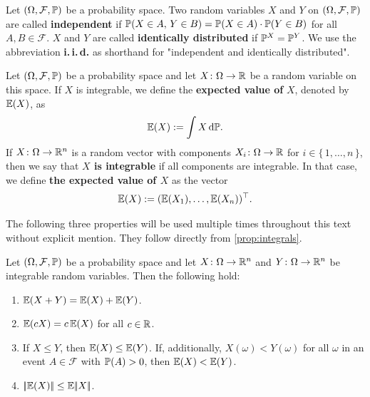 \begin{definition}
    Let $(\Omega, \mathcal{F}, \mathbb{P})$ be a probability space. Two random variables $X$ and $Y$
    on $(\Omega, \mathcal{F}, \mathbb{P})$ are called \textbf{independent} if $\mathbb{P}(X\in A,\, Y\in B)
    = \mathbb{P}(X\in A)\cdot \mathbb{P}(Y\in B)$ for all $A,B\in\mathcal{F}$. $X$ and $Y$ are called
    \textbf{identically distributed} if $\mathbb{P}^X = \mathbb{P}^Y$.
    We use the abbreviation \textbf{i.\,i.\,d.} as shorthand for "independent and identically distributed".
\end{definition}

\begin{definition}
    Let $(\Omega, \mathcal{F}, \mathbb{P})$ be a probability space and let $X\colon\Omega\to\mathbb{R}$
    be a random variable on this space.
    If $X$ is integrable, we define the \textbf{expected value of} $X$,
    denoted by $\mathbb{E}(X)$, as
    \[
        \mathbb{E}(X) := \int X \, \textnormal{d}\mathbb{P}.
    \]
    If $X\colon\Omega\to\mathbb{R}^n$ is a random vector with components
    $X_i\colon\Omega\to\mathbb{R}$ for $i\in\{\, 1,\dots,n \,\}$, then we
    say that \textbf{$X$ is integrable} if all components are integrable. In that case,
    we define \textbf{the expected
    value of $X$} as the vector
    \[
        \mathbb{E}(X) := (\mathbb{E}(X_1),\dots, \mathbb{E}(X_n))^\top.
    \]
\end{definition}
The following three properties will be used multiple times throughout this text without explicit mention. They
follow directly from \cref{prop:integrals}.
\begin{proposition}
    \label{prop:properties-of-expected-value}
    Let $(\Omega, \mathcal{F}, \mathbb{P})$ be a
    probability space and let $X\colon \Omega \to \mathbb{R}^n$ and
    $Y\colon \Omega \to \mathbb{R}^n$ be integrable random variables. Then the following hold:
    \begin{enumerate}
        \item[(i)] $\mathbb{E}(X + Y) = \mathbb{E}(X) + \mathbb{E}(Y)$.
        \item[(ii)] $\mathbb{E}(c X) = c\, \mathbb{E}(X)$ for all $c\in\mathbb{R}$.
        \item[(iii)] If $X \leq Y$, then $\mathbb{E}(X) \leq \mathbb{E}(Y)$. If, additionally,
        $X(\omega) < Y(\omega)$ for all $\omega$ in an event $A\in\mathcal{F}$ with $\mathbb{P}(A) > 0$,
        then $\mathbb{E}(X) < \mathbb{E}(Y)$.
        \item[(iv)] $|\!|\mathbb{E}(X)|\!| \leq \mathbb{E}|\!|X|\!|$.
    \end{enumerate}
\end{proposition}



